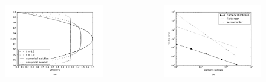 \begin{frame}
\begin{center}
\begin{columns}[c]
\begin{column}{0.35\textwidth}
\end{column}
\end{columns}
\end{center}
\vspace{-1.0cm}
\begin{center}
\begin{columns}[c]
\begin{column}{0.55\textwidth} 
\begin{figure}
  \centering
  \includegraphics[scale=0.33]{images/poiseuille_velocity.pdf}
\end{figure}
\end{column}
\begin{column}{0.65\textwidth} 
\begin{figure}
  \centering
  \includegraphics[scale=0.33]{images/poiseuille_error.pdf}

\end{figure}
\end{column}
\end{columns}
\end{center}
\end{frame}

